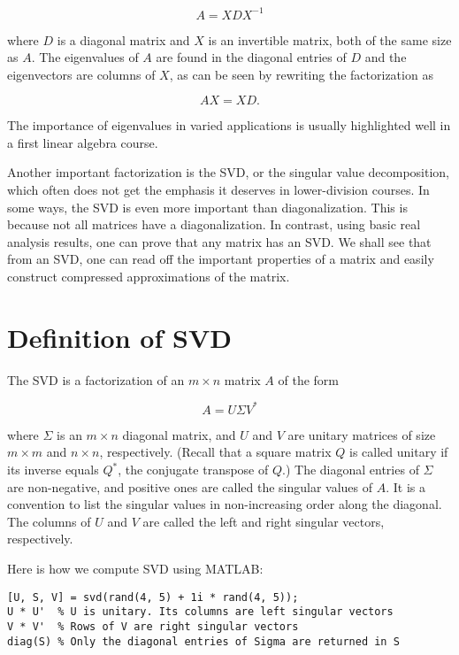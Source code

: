 \documentclass{ximera}
\begin{document}
\[
A = X D X^{-1}
\]

where \( D \) is a diagonal matrix and \( X \) is an invertible matrix, both of the same size as \( A \). The eigenvalues of \( A \) are found in the diagonal entries of \( D \) and the eigenvectors are columns of \( X \), as can be seen by rewriting the factorization as

\[
A X = X D.
\]

The importance of eigenvalues in varied applications is usually highlighted well in a first linear algebra course.

Another important factorization is the SVD, or the singular value decomposition, which often does not get the emphasis it deserves in lower-division courses. In some ways, the SVD is even more important than diagonalization. This is because not all matrices have a diagonalization. In contrast, using basic real analysis results, one can prove that any matrix has an SVD. We shall see that from an SVD, one can read off the important properties of a matrix and easily construct compressed approximations of the matrix.

\section{Definition of SVD}

The SVD is a factorization of an \( m \times n \) matrix \( A \) of the form

\[
A = U \Sigma V^*
\]

where \( \Sigma \) is an \( m \times n \) diagonal matrix, and \( U \) and \( V \) are unitary matrices of size \( m \times m \) and \( n \times n \), respectively. (Recall that a square matrix \( Q \) is called unitary if its inverse equals \( Q^* \), the conjugate transpose of \( Q \).) The diagonal entries of \( \Sigma \) are non-negative, and positive ones are called the singular values of \( A \). It is a convention to list the singular values in non-increasing order along the diagonal. The columns of \( U \) and \( V \) are called the left and right singular vectors, respectively.

Here is how we compute SVD using MATLAB:

\begin{verbatim}
[U, S, V] = svd(rand(4, 5) + 1i * rand(4, 5));
U * U'  % U is unitary. Its columns are left singular vectors
V * V'  % Rows of V are right singular vectors
diag(S) % Only the diagonal entries of Sigma are returned in S
\end{verbatim}
\end{document}
